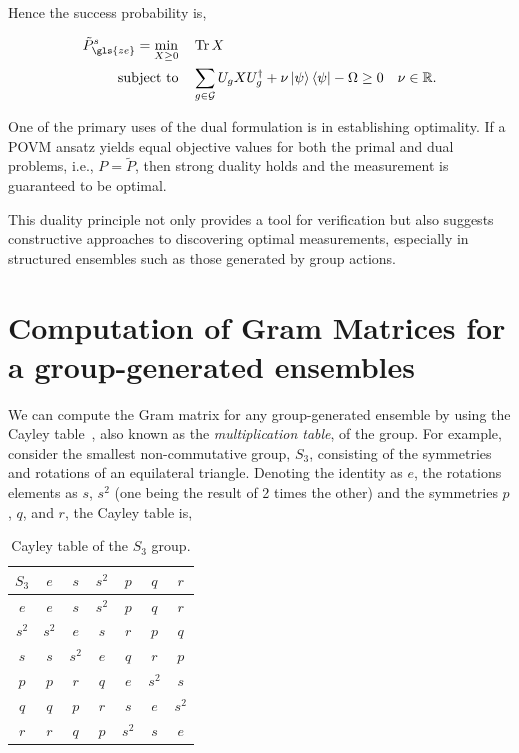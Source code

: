 \documentclass[12pt,letterpaper]{article}
\DeclareMathOperator{\tr}{Tr}
\begin{document}
Hence the success probability is,

\begin{align*}
	\tilde{P}_{\gls{ze}}^s = \min_{X\geq 0} \quad & \tr{X} \\
	\text{subject to} \quad & \sum_{g\in\mathcal{G}}U_gXU_g^\dagger+ \nu\ket{\psi}\bra{\psi}-\Omega \geq 0 \quad \nu \in \mathbb{R}.
\end{align*}

One of the primary uses of the dual formulation is in establishing optimality. If a POVM ansatz yields equal objective values for both the primal and dual problems, i.e., $P = \tilde{P}$, then strong duality holds and the measurement is guaranteed to be optimal.

This duality principle not only provides a tool for verification but also suggests constructive approaches to discovering optimal measurements, especially in structured ensembles such as those generated by group actions.

\section{Computation of Gram Matrices for a group-generated ensembles}\label{appendixComputationGroupGeneratedGramMatrices}

\hspace{20pt}We can compute the Gram matrix for any group-generated ensemble by using the Cayley table~\cite{CayleyTable}, also known as the \emph{multiplication table}, of the group. For example, consider the smallest non-commutative group, $S_3$, consisting of the symmetries and rotations of an equilateral triangle. Denoting the identity as $e$, the rotations elements as $s$, $s^2$ (one being the result of 2 times the other) and the symmetries $p$, $q$, and $r$, the Cayley table is,

\begin{table}[H]
	\centering
	\caption{Cayley table of the $S_3$ group.}
	\begin{tabular}{c||c c c c c c}
        $S_3$ & $e$ & $s$ & $s^2$ & $p$ & $q$ & $r$ \\\hline\hline
        $e$   & $e$ & $s$ & $s^2$ & $p$ & $q$ & $r$ \\
        $s^2$ & $s^2$ & $e$ & $s$ & $r$ & $p$ & $q$ \\
        $s$   & $s$ & $s^2$ & $e$ & $q$ & $r$ & $p$ \\
        $p$   & $p$ & $r$ & $q$ & $e$ & $s^2$ & $s$ \\
        $q$   & $q$ & $p$ & $r$ & $s$ & $e$ & $s^2$ \\
        $r$   & $r$ & $q$ & $p$ & $s^2$ & $s$ & $e$
    \end{tabular}
\end{table}
\end{document}
